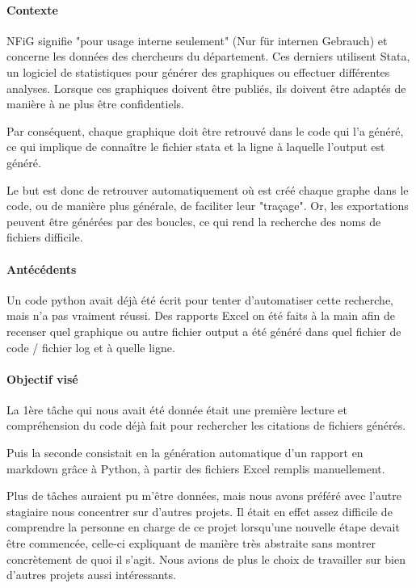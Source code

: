 \paragraph{Contexte}

NFiG signifie "pour usage interne seulement" (Nur für internen Gebrauch) et concerne les données des chercheurs du département. 
Ces derniers utilisent Stata, un logiciel de statistiques pour générer des graphiques ou effectuer différentes analyses.
Lorsque ces graphiques doivent être publiés, ils doivent être adaptés de manière à ne plus être confidentiels.

Par conséquent, chaque graphique doit être retrouvé dans le code qui l'a généré, ce qui implique de connaître le fichier stata et la ligne à laquelle l'output est généré.

Le but est donc de retrouver automatiquement où est créé chaque graphe dans le code, ou de manière plus générale, de faciliter leur "traçage".
Or, les exportations peuvent être générées par des boucles, ce qui rend la recherche des noms de fichiers difficile.

\paragraph{Antécédents}

Un code python avait déjà été écrit pour tenter d'automatiser cette recherche, mais n'a pas vraiment réussi.
Des rapports Excel on été faits à la main afin de recenser quel graphique ou autre fichier output a été généré dans quel fichier de code / fichier log et à quelle ligne. 

\paragraph{Objectif visé}

La 1ère tâche qui nous avait été donnée était une première lecture et compréhension du code déjà fait pour rechercher les citations de fichiers générés.

Puis la seconde consistait en la génération automatique d'un rapport en markdown grâce à Python, à partir des fichiers Excel remplis manuellement.

Plus de tâches auraient pu m'être données, mais nous avons préféré avec l'autre stagiaire nous concentrer sur d'autres projets. 
Il était en effet assez difficile de comprendre la personne en charge de ce projet lorsqu'une nouvelle étape devait être commencée, celle-ci expliquant de manière très abstraite sans montrer concrètement de quoi il s'agit.
Nous avions de plus le choix de travailler sur bien d'autres projets aussi intéressants.

